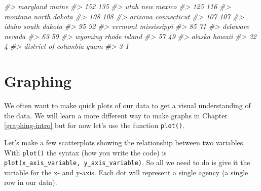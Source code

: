 \documentclass[
  12pt,
  openany]{book}
\newenvironment{Shaded}{\begin{snugshade}}{\end{snugshade}}
\newcommand{\CommentTok}[1]{\textcolor[rgb]{0.37,0.37,0.37}{\textit{#1}}}
\newcommand{\FunctionTok}[1]{\textcolor[rgb]{0,0,0}{#1}}
\newcommand{\NormalTok}[1]{#1}
\newcommand{\SpecialCharTok}[1]{\textcolor[rgb]{0,0,0}{#1}}
\begin{document}
\begin{Shaded}
\begin{Highlighting}[]
\CommentTok{\#\textgreater{}             maryland                maine }
\CommentTok{\#\textgreater{}                  152                  135 }
\CommentTok{\#\textgreater{}                 utah           new mexico }
\CommentTok{\#\textgreater{}                  125                  116 }
\CommentTok{\#\textgreater{}              montana         north dakota }
\CommentTok{\#\textgreater{}                  108                  108 }
\CommentTok{\#\textgreater{}              arizona          connecticut }
\CommentTok{\#\textgreater{}                  107                  107 }
\CommentTok{\#\textgreater{}                idaho         south dakota }
\CommentTok{\#\textgreater{}                   95                   92 }
\CommentTok{\#\textgreater{}              vermont          mississippi }
\CommentTok{\#\textgreater{}                   85                   71 }
\CommentTok{\#\textgreater{}             delaware               nevada }
\CommentTok{\#\textgreater{}                   63                   59 }
\CommentTok{\#\textgreater{}              wyoming         rhode island }
\CommentTok{\#\textgreater{}                   57                   49 }
\CommentTok{\#\textgreater{}               alaska               hawaii }
\CommentTok{\#\textgreater{}                   32                    4 }
\CommentTok{\#\textgreater{} district of columbia                 guam }
\CommentTok{\#\textgreater{}                    3                    1}
\end{Highlighting}
\end{Shaded}

\hypertarget{graphing}{%
\section{Graphing}\label{graphing}}

We often want to make quick plots of our data to get a visual understanding of the data. We will learn a more different way to make graphs in Chapter \ref{graphing-intro} but for now let's use the function \texttt{plot()}.

Let's make a few scatterplots showing the relationship between two variables. With \texttt{plot()} the syntax (how you write the code) is \texttt{plot(x\_axis\_variable,\ y\_axis\_variable)}. So all we need to do is give it the variable for the x- and y-axis. Each dot will represent a single agency (a single row in our data).

\begin{Shaded}
\end{Shaded}
\end{document}
